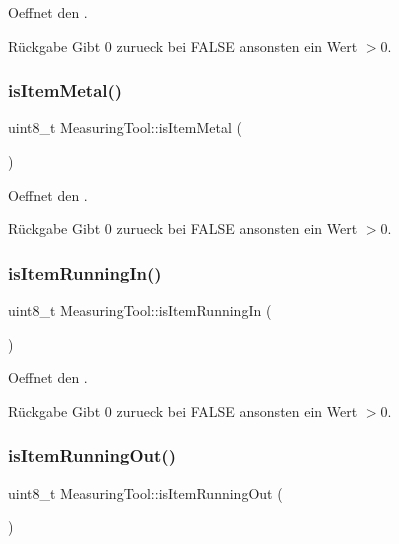 Oeffnet den .

\begin{DoxyReturn}{Rückgabe}
Gibt 0 zurueck bei F\+A\+L\+SE ansonsten ein Wert $>$0. 
\end{DoxyReturn}
\hypertarget{class_measuring_tool_a1d98ab82733fbdee6e63f880a8ace322}{}\label{class_measuring_tool_a1d98ab82733fbdee6e63f880a8ace322} 
\subsubsection{\texorpdfstring{is\+Item\+Metal()}{isItemMetal()}}
{\footnotesize\ttfamily uint8\+\_\+t Measuring\+Tool\+::is\+Item\+Metal (\begin{DoxyParamCaption}{ }\end{DoxyParamCaption})}

Oeffnet den .

\begin{DoxyReturn}{Rückgabe}
Gibt 0 zurueck bei F\+A\+L\+SE ansonsten ein Wert $>$0. 
\end{DoxyReturn}
\hypertarget{class_measuring_tool_a1749a84c95ae88ef6e8e65edfa2204bc}{}\label{class_measuring_tool_a1749a84c95ae88ef6e8e65edfa2204bc} 
\subsubsection{\texorpdfstring{is\+Item\+Running\+In()}{isItemRunningIn()}}
{\footnotesize\ttfamily uint8\+\_\+t Measuring\+Tool\+::is\+Item\+Running\+In (\begin{DoxyParamCaption}{ }\end{DoxyParamCaption})}

Oeffnet den .

\begin{DoxyReturn}{Rückgabe}
Gibt 0 zurueck bei F\+A\+L\+SE ansonsten ein Wert $>$0. 
\end{DoxyReturn}
\hypertarget{class_measuring_tool_a0941de19234c2026359e4cc973f7bb1b}{}\label{class_measuring_tool_a0941de19234c2026359e4cc973f7bb1b} 
\subsubsection{\texorpdfstring{is\+Item\+Running\+Out()}{isItemRunningOut()}}
{\footnotesize\ttfamily uint8\+\_\+t Measuring\+Tool\+::is\+Item\+Running\+Out (\begin{DoxyParamCaption}{ }\end{DoxyParamCaption})}

